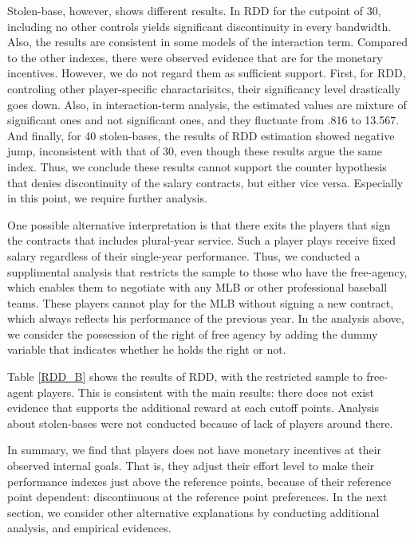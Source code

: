 \documentclass[dvipdfmx, 12pt]{article}
\begin{document}
Stolen-base, however, shows different results. In RDD for the cutpoint of 30, including no other controls yields significant discontinuity in every bandwidth. Also, the results are consistent in some models of the interaction term. Compared to the other indexes, there were observed evidence that are for the monetary incentives. However, we do not regard them as sufficient support. First, for RDD, controling other player-specific charactarisitcs, their significancy level drastically goes down. Also, in interaction-term analysis, the estimated values are mixture of significant ones and not significant ones, and they fluctuate from .816 to 13.567. And finally, for 40 stolen-bases, the results of RDD estimation showed negative jump, inconsistent with that of 30, even though these results argue the same index. Thus, we conclude these results cannot support the counter hypothesis that denies discontinuity of the salary contracts, but either vice versa. Especially in this point, we require further analysis.

One possible alternative interpretation is that there exits the players that sign the contracts that includes plural-year service. Such a player plays receive fixed salary regardless of their single-year performance. Thus, we conducted a supplimental analysis that restricts the sample to those who have the free-agency, which enables them to negotiate with any MLB or other professional baseball teams. These players cannot play for the MLB without signing a new contract, which always reflects his performance of the previous year. In the analysis above, we consider the possession of the right of free agency by adding the dummy variable that indicates whether he holds the right or not.



Table \ref{RDD_B} shows the results of RDD, with the restricted sample to free-agent players. This is consistent with the main results: there does not exist evidence that supports the additional reward at each cutoff points. Analysis about stolen-bases were not conducted because of lack of players around there.

In summary, we find that players does not have monetary incentives at their observed internal goals. That is, they adjust their effort level to make their performance indexes just above the reference points, because of their reference point dependent: discontinuous at the reference point preferences. In the next section, we consider other alternative explanations by conducting additional analysis, and empirical evidences.
\end{document}

